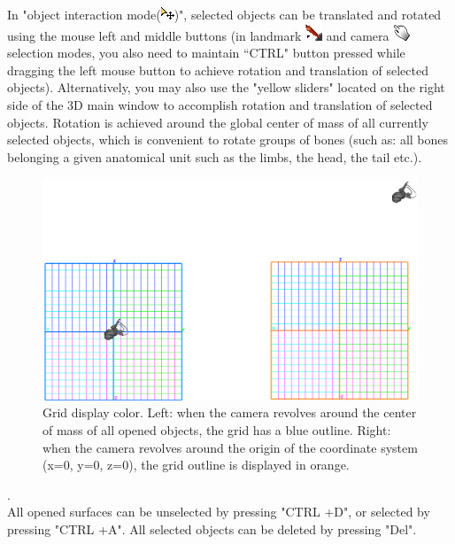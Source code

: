 \documentclass[12pt, a4paper]{book}
\begin{document}
In "object interaction mode(\includegraphics[scale=0.7]{../images/04/move_mode.png})", selected objects can be translated and rotated using the mouse left and middle buttons (in landmark \includegraphics[scale=0.7]{../images/04/Landmarks2.png} and camera  \includegraphics[scale=0.7]{../images/04/camera_mode.png} selection modes, you also need to maintain ``CTRL" button pressed while dragging the left mouse button to achieve rotation and translation of selected objects). Alternatively, you may also use the "yellow sliders" located on the right side of the 3D main window to accomplish rotation and translation of selected objects. Rotation is achieved around the global center of mass of all currently selected objects, which is convenient to rotate groups of bones (such as: all bones belonging a given anatomical unit such as the limbs, the head, the tail etc.).\\
\begin{figure}
  \centering
  \includegraphics[scale=0.3]{grid.png} 
	\caption{Grid display color.  Left: when the camera revolves around the center of mass of all opened objects, the grid has a blue outline. Right: when the camera revolves around the origin of the coordinate system (x=0, y=0, z=0), the grid outline is displayed in orange.}
\label{grid_color}
 
\end{figure}

.\\
All opened surfaces can be unselected by pressing "CTRL +D", or selected by pressing "CTRL +A". All selected objects can be deleted by pressing "Del".
\end{document}
